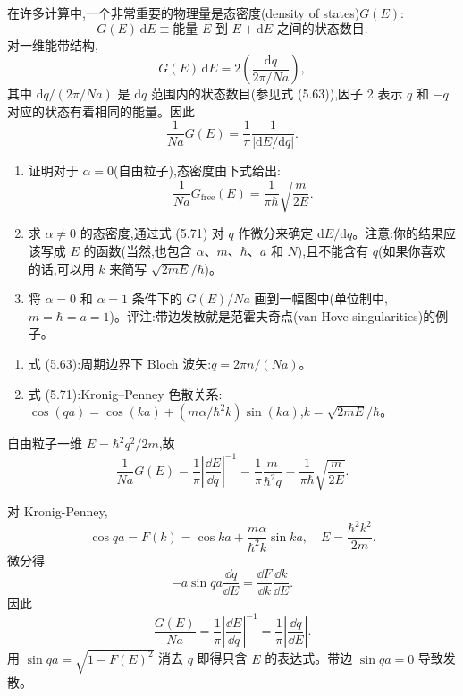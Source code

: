 \begin{question}
在许多计算中,一个非常重要的物理量是态密度(density of states)$G(E)$:
\[
G(E)\,\mathrm dE\equiv \text{能量 }E\text{ 到 }E+\mathrm dE\text{ 之间的状态数目}.
\]
对一维能带结构,
\[
G(E)\,\mathrm dE=2\left(\frac{\mathrm dq}{2\pi/Na}\right),
\]
其中 $\mathrm dq/(2\pi/Na)$ 是 $\mathrm dq$ 范围内的状态数目(参见式 (5.63)),因子 2 表示 $q$ 和 $-q$ 对应的状态有着相同的能量。因此
\[
\frac{1}{Na}G(E)=\frac{1}{\pi}\frac{1}{|\mathrm dE/\mathrm dq|}.
\]
\begin{enumerate}
\item 证明对于 $\alpha=0$(自由粒子),态密度由下式给出:
\[
\frac{1}{Na}G_{\mathrm{free}}(E)=\frac{1}{\pi\hbar}\sqrt{\frac{m}{2E}}.
\]
\item 求 $\alpha\ne0$ 的态密度,通过式 (5.71) 对 $q$ 作微分来确定 $\mathrm dE/\mathrm dq$。注意:你的结果应该写成 $E$ 的函数(当然,也包含 $\alpha$、$m$、$\hbar$、$a$ 和 $N$),且不能含有 $q$(如果你喜欢的话,可以用 $k$ 来简写 $\sqrt{2mE}/\hbar$)。
\item 将 $\alpha=0$ 和 $\alpha=1$ 条件下的 $G(E)/Na$ 画到一幅图中(单位制中,$m=\hbar=a=1$)。评注:带边发散就是范霍夫奇点(van Hove singularities)的例子。
\end{enumerate}

\par\smallskip
{}
\begin{enumerate}[leftmargin=2.2em,itemsep=0.12em,topsep=0.12em,parsep=0pt]
\item 式 (5.63):周期边界下 Bloch 波矢:$q=2\pi n/(Na)$。
\item 式 (5.71):Kronig--Penney 色散关系:$\cos(qa)=\cos(ka)+(m\alpha/\hbar^2k)\sin(ka)$,$k=\sqrt{2mE}/\hbar$。
\end{enumerate}

\end{question}
\begin{solution}

自由粒子一维 $E=\hbar^2q^2/2m$,故
\[
\frac{1}{Na}G(E)=\frac1\pi\left|\frac{\dd E}{\dd q}\right|^{-1}
=\frac1\pi\frac{m}{\hbar^2q}
=\frac{1}{\pi\hbar}\sqrt{\frac{m}{2E}}.
\]

对 Kronig-Penney,
\[
\cos qa=F(k)=\cos ka+\frac{m\alpha}{\hbar^2k}\sin ka,
\quad E=\frac{\hbar^2k^2}{2m}.
\]
微分得
\[
-a\sin qa\frac{\dd q}{\dd E}=\frac{\dd F}{\dd k}\frac{\dd k}{\dd E}.
\]
因此
\[
\frac{G(E)}{Na}=\frac1\pi\left|\frac{\dd E}{\dd q}\right|^{-1}
=\frac1\pi\left|\frac{\dd q}{\dd E}\right|.
\]
用 $\sin qa=\sqrt{1-F(E)^2}$ 消去 $q$ 即得只含 $E$ 的表达式。带边 $\sin qa=0$ 导致发散。

\end{solution}

